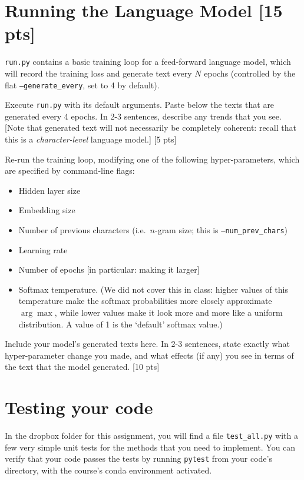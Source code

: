 \documentclass[11pt]{article}
\begin{document}
\section{Running the Language Model [15 pts]}

\texttt{run.py} contains a basic training loop for a feed-forward language model, which will record the training loss and generate text every $N$ epochs (controlled by the flat \texttt{--generate\_every}, set to 4 by default).

\vspace{2em}
  Execute \texttt{run.py} with its default arguments.  Paste below the texts that are generated every 4 epochs.  In 2-3 sentences, describe any trends that you see.  [Note that generated text will not necessarily be completely coherent: recall that this is a \emph{character-level} language model.] \hfill [5 pts]

\vspace{2em}
 Re-run the training loop, modifying one of the following hyper-parameters, which are specified by command-line flags:
\begin{itemize}
  \item Hidden layer size
  \item Embedding size
  \item Number of previous characters (i.e.\ $n$-gram size; this is \texttt{--num\_prev\_chars})
  \item Learning rate
  \item Number of epochs [in particular: making it larger]
  \item Softmax temperature.  (We did not cover this in class: higher values of this temperature make the softmax probabilities more closely approximate $\arg\max$, while lower values make it look more and more like a uniform distribution.  A value of 1 is the `default' softmax value.)
\end{itemize}
Include your model's generated texts here.  In 2-3 sentences, state exactly what hyper-parameter change you made, and what effects (if any) you see in terms of the text that the model generated. \hfill [10 pts]

\section{Testing your code}

In the dropbox folder for this assignment, you will find a file \texttt{test\_all.py} with a few very simple unit tests for the methods that you need to implement.  You can verify that your code passes the tests by running \texttt{pytest} from your code's directory, with the course's conda environment activated.
\end{document}
